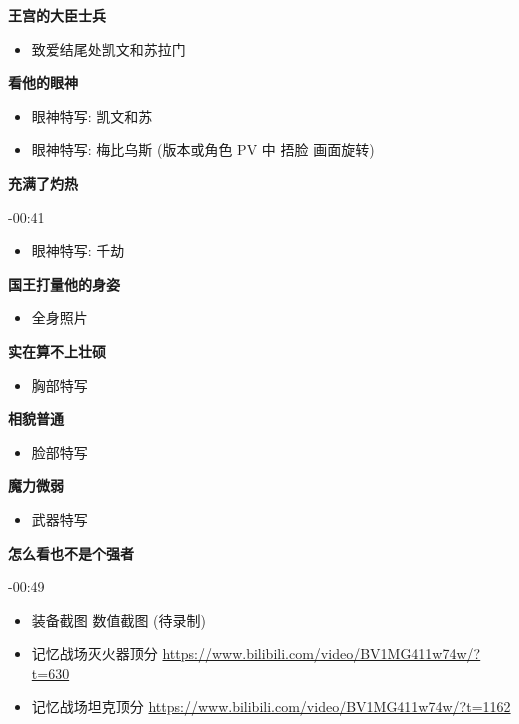 \documentclass[a4paper]{article}
\begin{document}
\textbf{王宫的大臣士兵}

\begin{itemize}
    \item 致爱结尾处凯文和苏拉门
\end{itemize}

\textbf{看他的眼神}

\begin{itemize}
    \item 眼神特写: 凯文和苏
    \item 眼神特写: 梅比乌斯 (版本或角色 PV 中 捂脸 画面旋转)
\end{itemize}

\textbf{充满了灼热}

-00:41

\begin{itemize}
    \item 眼神特写: 千劫
\end{itemize}

\textbf{国王打量他的身姿}

\begin{itemize}
    \item 全身照片
\end{itemize}

\textbf{实在算不上壮硕}

\begin{itemize}
    \item 胸部特写
\end{itemize}

\textbf{相貌普通}

\begin{itemize}
    \item 脸部特写
\end{itemize}

\textbf{魔力微弱}

\begin{itemize}
    \item 武器特写
\end{itemize}

\textbf{怎么看也不是个强者}

-00:49

\begin{itemize}
    \item 装备截图 数值截图 (待录制)
    \item 记忆战场灭火器顶分 \url{https://www.bilibili.com/video/BV1MG411w74w/?t=630}
    \item 记忆战场坦克顶分 \url{https://www.bilibili.com/video/BV1MG411w74w/?t=1162}
\end{itemize}
\end{document}
